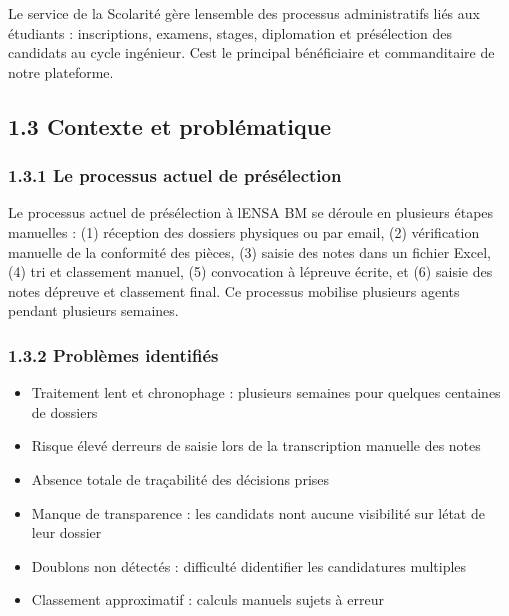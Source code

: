 \documentclass[
]{article}
\begin{document}
Le service de la Scolarité gère l\textquotesingle ensemble des processus
administratifs liés aux étudiants : inscriptions, examens, stages,
diplomation et présélection des candidats au cycle ingénieur.
C\textquotesingle est le principal bénéficiaire et commanditaire de
notre plateforme.

\hypertarget{contexte-et-probluxe9matique}{%
\subsection{1.3 Contexte et
problématique}\label{contexte-et-probluxe9matique}}

\hypertarget{le-processus-actuel-de-pruxe9suxe9lection}{%
\subsubsection{1.3.1 Le processus actuel de
présélection}\label{le-processus-actuel-de-pruxe9suxe9lection}}

Le processus actuel de présélection à l\textquotesingle ENSA BM se
déroule en plusieurs étapes manuelles : (1) réception des dossiers
physiques ou par email, (2) vérification manuelle de la conformité des
pièces, (3) saisie des notes dans un fichier Excel, (4) tri et
classement manuel, (5) convocation à l\textquotesingle épreuve écrite,
et (6) saisie des notes d\textquotesingle épreuve et classement final.
Ce processus mobilise plusieurs agents pendant plusieurs semaines.

\hypertarget{probluxe8mes-identifiuxe9s}{%
\subsubsection{1.3.2 Problèmes
identifiés}\label{probluxe8mes-identifiuxe9s}}

\begin{itemize}
\item
  Traitement lent et chronophage : plusieurs semaines pour quelques
  centaines de dossiers
\item
  Risque élevé d\textquotesingle erreurs de saisie lors de la
  transcription manuelle des notes
\item
  Absence totale de traçabilité des décisions prises
\item
  Manque de transparence : les candidats n\textquotesingle ont aucune
  visibilité sur l\textquotesingle état de leur dossier
\item
  Doublons non détectés : difficulté d\textquotesingle identifier les
  candidatures multiples
\item
  Classement approximatif : calculs manuels sujets à erreur
\end{itemize}
\end{document}
